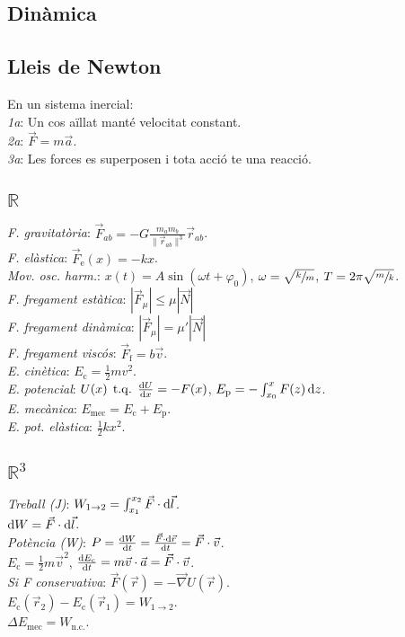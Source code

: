 \documentclass[10pt]{article}
\newcommand{\real}{\mathbb{R}}
\newcommand{\ci}{\textbullet\;}
\DeclareMathOperator{\tq}{\;t.q.\;}
\begin{document}
\begin{multicols}{3}
\section{Din\`amica}

\subsection{Lleis de Newton}
En un sistema inercial:\\
\emph{1a}: Un cos aïllat manté velocitat constant.\\
\emph{2a}: $\vec{F} = m\vec{a}$.\\
\emph{3a}: Les forces es superposen i tota acció te una reacció.

\subsection{$\real$}
\emph{F. gravitat\`oria}: $\vec{F}_{ab} = -G \frac{m_a m_b}{\|\vec{r}_{ab}\|^3} \vec{r}_{ab}$. \\
\emph{F. el\`astica}: $\vec{F}_{\text{e}}(x) = -kx$. \\
\emph{Mov. osc. harm.}: $x(t) = A\sin (\omega t + \varphi_0)$, $\omega = \sqrt{\sfrac{k}{m}}$, $T = 2\pi\sqrt{\sfrac{m}{k}}$. \\
\emph{F. fregament estàtica}: $|\vec{F}_\mu| \leq \mu |\vec{N}|$\\
\emph{F. fregament dinàmica}: $|\vec{F}_\mu| = \mu' |\vec{N}|$\\
\emph{F. fregament visc\'os}: $\vec{F}_{\text{f}} = b\vec{v}$. \\
\emph{E. cin\`etica}: $E_{\text{c}} = \frac{1}{2}mv^2$. \\
\emph{E. potencial}: $U(x) \tq \frac{\dif U}{\dif x} = -F(x)$, $E_{\text{p}} = -\int_{x_0}^x F(z) \dif z$. \\
\emph{E. mecànica}: $E_{\text{mec}} = E_{\text{c}} + E_{\text{p}}$. \\
\emph{E. pot. el\`astica}: $\frac{1}{2}kx^2$.

\subsection{$\real^3$}
\emph{Treball (J)}: $W_{1\rightarrow 2} = \int_{x_1}^{x_2} \vec{F} \cdot\dif \vec{l}$. \\
\ci $\dif W = \vec{F} \cdot\dif \vec{l}$. \\
\emph{Pot\`encia (W)}: $P = \frac{\dif W}{\dif t} = \frac{\vec{F} \cdot\dif \vec{r}}{\dif t} = \vec{F}\cdot\vec{v}$. \\
\ci $E_{\text{c}} = \frac{1}{2}m\vec{v}^2$, $\frac{\dif E_{\text{c}}}{\dif t} = m\vec{v}\cdot\vec{a} = \vec{F}\cdot\vec{v}$. \\
\emph{Si F conservativa}: $\vec{F}(\vec{r}) = -\vec{\nabla}U(\vec{r})$. \\
\ci $E_{\text{c}}(\vec{r}_2) - E_{\text{c}}(\vec{r}_1) = W_{1\rightarrow 2}$. \\
\ci $\Delta E_{\text{mec}} = W_{\text{n.c.}}$.



\end{multicols}
\end{document}
